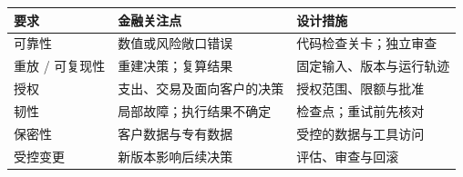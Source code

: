 \begin{tabular}{@{}P{2.8cm}P{4.7cm}P{5.1cm}@{}}
\toprule
\textbf{要求} & \textbf{金融关注点} & \textbf{设计措施} \\
\midrule
可靠性 & 数值或风险敞口错误 & 代码检查关卡；独立审查 \\
重放 / 可复现性 & 重建决策；复算结果 & 固定输入、版本与运行轨迹 \\
授权 & 支出、交易及面向客户的决策 & 授权范围、限额与批准 \\
韧性 & 局部故障；执行结果不确定 & 检查点；重试前先核对 \\
保密性 & 客户数据与专有数据 & 受控的数据与工具访问 \\
受控变更 & 新版本影响后续决策 & 评估、审查与回滚 \\
\bottomrule
\end{tabular}
